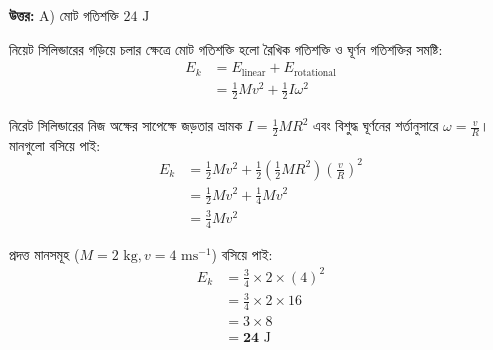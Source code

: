 \documentclass[12pt, a4paper]{article}
\begin{document}
\vspace{0.5em}
\begin{tcolorbox}[answerbox]
    \textbf{\color{success} উত্তর:} A) মোট গতিশক্তি $24\text{ J}$
\end{tcolorbox}
\vspace{1em}

\begin{tcolorbox}[solutionbox={সমাধান (Solution)}]
    \noindent
    নিয়েট সিলিন্ডারের গড়িয়ে চলার ক্ষেত্রে মোট গতিশক্তি হলো রৈখিক গতিশক্তি ও ঘূর্ণন গতিশক্তির সমষ্টি:
    \begin{align*}
        E_k &= E_{\text{linear}} + E_{\text{rotational}} \\
            &= \frac{1}{2} M v^2 + \frac{1}{2} I \omega^2
    \end{align*}
    
    নিরেট সিলিন্ডারের নিজ অক্ষের সাপেক্ষে জড়তার ভ্রামক $I = \frac{1}{2} M R^2$ এবং বিশুদ্ধ ঘূর্ণনের শর্তানুসারে $\omega = \frac{v}{R}$। মানগুলো বসিয়ে পাই:
    \begin{align*}
        E_k &= \frac{1}{2} M v^2 + \frac{1}{2} \left(\frac{1}{2} M R^2\right) \left(\frac{v}{R}\right)^2 \\
            &= \frac{1}{2} M v^2 + \frac{1}{4} M v^2 \\
            &= \frac{3}{4} M v^2
    \end{align*}
    
    প্রদত্ত মানসমূহ ($M = 2\text{ kg}, v = 4\text{ ms}^{-1}$) বসিয়ে পাই:
    \begin{align*}
        E_k &= \frac{3}{4} \times 2 \times (4)^2 \\
            &= \frac{3}{4} \times 2 \times 16 \\
            &= 3 \times 8 \\
            &= \mathbf{24}\text{ J}
    \end{align*}
\end{tcolorbox}
\end{document}

